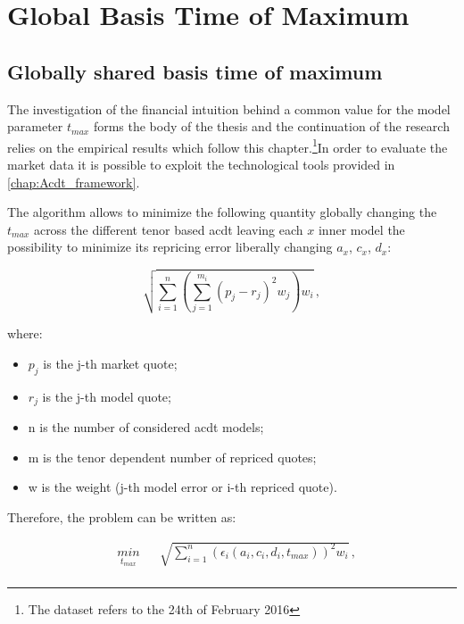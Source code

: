 \chapter{Global Basis Time of Maximum}
\label{chap:fixing_t}


\section{Globally shared basis time of maximum}

The investigation of the financial intuition behind a common value for the model parameter $t_{max}$ forms the body of the thesis and the continuation of the research relies on the empirical results which follow this chapter.\footnote{The dataset refers to the 24th of February 2016}In order to evaluate the market data it is possible to exploit the technological tools provided in \eqref{chap:Acdt_framework}.

The algorithm allows to minimize the following quantity globally changing the $t_{max}$ across the different tenor based acdt leaving each $x$ inner model the possibility to minimize its repricing error liberally changing $a_{x}$, $c_{x}$, $d_{x}$:

\begin{equation}
\sqrt{\sum_{i=1}^{n}\left(\sum_{j=1}^{m_{i}}(p_{j}-r_{j})^{2}w_{j} \right)w_{i}}\,,
\label{eq:global_error}
\end{equation}

where:

\begin{itemize}
    \item $p_{j}$ is the j-th market quote;
    \item $r_{j}$ is the j-th model quote;
    \item n is the number of considered acdt models;
    \item m is the tenor dependent number of repriced quotes;
    \item w is the weight (j-th model error or i-th repriced quote).
\end{itemize}

Therefore, the problem can be written as:

\begin{equation*}
\begin{aligned}
& \underset{t_{max}}{min}
& & \sqrt{\sum_{i=1}^{n}(\epsilon_{i}(a_{i},c_{i},d_{i},t_{max}))^{2}w_{i}}\,, \\
\end{aligned}
\end{equation*}

